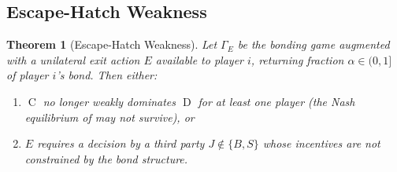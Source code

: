 \documentclass[11pt,a4paper]{article}
\newtheorem{theorem}{Theorem}[section]
\theoremstyle{definition}
\theoremstyle{remark}
\DeclareMathOperator{\Coop}{C}
\DeclareMathOperator{\Def}{D}
\begin{document}
\subsection{Escape-Hatch Weakness}

\begin{theorem}[Escape-Hatch Weakness]
\label{thm:escape-hatch-weakness}
Let $\Gamma_E$ be the bonding game augmented with a unilateral exit
action $E$ available to player $i$, returning fraction $\alpha \in (0, 1]$
of player $i$'s bond. Then either:
\begin{enumerate}[label=(\alph*)]
  \item $\Coop$ no longer weakly dominates $\Def$ for at least one
    player (the Nash equilibrium of 
    may not survive), or
  \item $E$ requires a decision by a third party $J \notin \{B, S\}$
    whose incentives are not constrained by the bond structure.
\end{enumerate}
\end{theorem}
\end{document}
